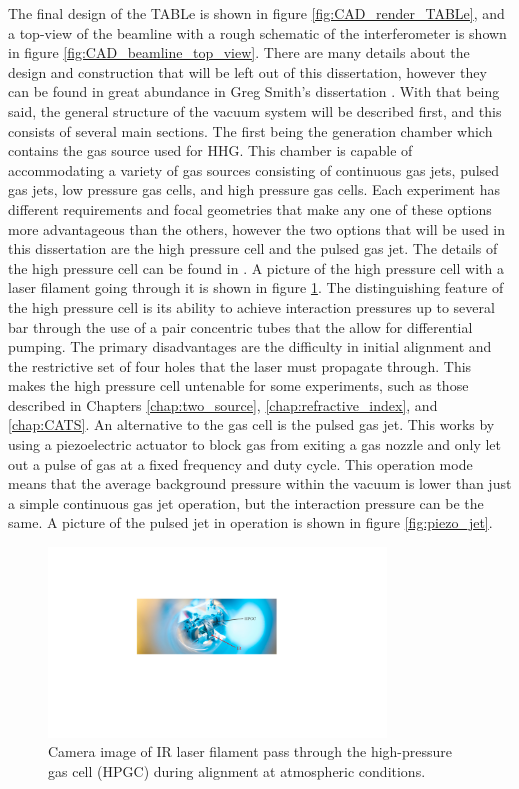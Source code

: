 The final design of the TABLe is shown in figure \ref{fig:CAD_render_TABLe}, and a top-view of the beamline with a rough schematic of the interferometer is shown in figure \ref{fig:CAD_beamline_top_view}. There are many details about the design and construction that will be left out of this dissertation, however they can be found in great abundance in Greg Smith's dissertation \cite{smithApplicationAttosecondTechniques2020}.  With that being said, the general structure of the vacuum system will be described first, and this consists of several main sections.  The first being the generation chamber which contains the gas source used for HHG.  This chamber is capable of accommodating a variety of gas sources consisting of continuous gas jets, pulsed gas jets, low pressure gas cells, and high pressure gas cells.  Each experiment has different requirements and focal geometries that make any one of these options more advantageous than the others, however the two options that will be used in this dissertation are the high pressure cell and the pulsed gas jet.  The details of the high pressure cell can be found in \cite{smithApplicationAttosecondTechniques2020}.  A picture of the high pressure cell with a laser filament going through it is shown in figure \ref{fig:HPGC_filament}.  The distinguishing feature of the high pressure cell is its ability to achieve interaction pressures up to several bar through the use of a pair concentric tubes that the allow for differential pumping.  The primary disadvantages are the difficulty in initial alignment and the restrictive set of four holes that the laser must propagate through.  This makes the high pressure cell untenable for some experiments, such as those described in Chapters \ref{chap:two_source}, \ref{chap:refractive_index}, and \ref{chap:CATS}.  An alternative to the gas cell is the pulsed gas jet.  This works by using a piezoelectric actuator to block gas from exiting a gas nozzle and only let out a pulse of gas at a fixed frequency and duty cycle.  This operation mode means that the average background pressure within the vacuum is lower than just a simple continuous gas jet operation, but the interaction pressure can be the same.  A picture of the pulsed jet in operation is shown in figure \ref{fig:piezo_jet}.
\label{sec:gas_source}
\begin{figure}
	\centering
	\includegraphics[width=0.8\textwidth]{figures/Beamline/HPGC.pdf}
	\caption[Image of laser passing through HPGC]{Camera image of IR laser filament pass through the high-pressure gas cell (HPGC) during alignment at atmospheric conditions.}
	\label{fig:HPGC_filament}
\end{figure}


